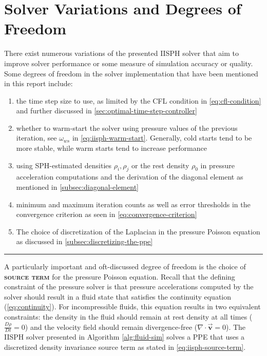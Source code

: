 \documentclass[oneside, a4paper]{book}
\newcommand\emphasis[1]{{\scshape\bfseries#1}}
\newcommand\horizontalspacer[0]{\vspace{5pt}\noindent\textcolor{lightgray}{\rule{\textwidth}{1mm}}
\vspace{5pt}}
\newcommand\vek[1]{\vec{\bm{#1}}}
\newcommand\divergence{{\nabla\cdot}}
\begin{document}
    \section{Solver Variations and Degrees of Freedom}\label{sec:alternative-source-terms}
    There exist numerous variations of the presented IISPH solver that aim to improve solver performance or some measure of simulation accuracy or quality. Some degrees of freedom in the solver implementation that have been mentioned in this report include: 
    \begin{enumerate}
      \item the time step size to use, as limited by the CFL condition in \autoref{eq:cfl-condition} and further discussed in \autoref{sec:optimal-time-step-controller}
      \item whether to warm-start the solver using pressure values of the previous iteration, see $\omega_{ws}$ in \autoref{eq:iisph-warm-start}. Generally, cold starts tend to be more stable, while warm starts tend to increase performance
      \item using SPH-estimated densities $\rho_i, \rho_j$ or the rest density $\rho_0$ in pressure acceleration computations and the derivation of the diagonal element as mentioned in \autoref{subsec:diagonal-element}
      \item minimum and maximum iteration counts as well as error thresholds in the convergence criterion as seen in \autoref{eq:convergence-criterion}
      \item The choice of discretization of the Laplacian in the pressure Poisson equation as discussed in \autoref{subsec:discretizing-the-ppe}
    \end{enumerate}

    \horizontalspacer

    A particularly important and oft-discussed degree of freedom is the choice of \emphasis{source term} for the pressure Poisson equation. Recall that the defining constraint of the pressure solver is that pressure accelerations computed by the solver should result in a fluid state that satisfies the continuity equation (\autoref{eq:continuity}). For incompressible fluids, this equation results in two equivalent constraints: the density in the fluid should remain at rest density at all times ($\frac{D\rho}{D t}=0$) and the velocity field should remain divergence-free ($\divergence \vek{v}=0$). The IISPH solver presented in Algorithm \ref{alg:fluid-sim} solves a PPE that uses a discretized density invariance source term as stated in \autoref{eq:iisph-source-term}. 
    
\end{document}
